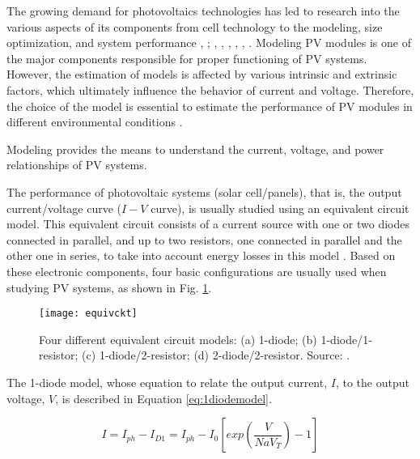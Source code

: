 The growing demand for photovoltaics technologies has led to research into the various aspects of its components from cell technology to the modeling, size optimization, and system performance \cite{Rajanna}, \cite{Badejani}; \cite{Yatimi}, \cite{Ferrari}, \cite{Saloux}, \cite{Hasan}, \cite{King}, \cite{Mellit}. Modeling PV modules is one of the major components responsible for proper functioning of PV systems. However, the estimation of models is affected by various intrinsic and extrinsic factors, which ultimately influence the behavior of current and voltage. Therefore, the choice of the model is essential to estimate the performance of PV modules in different environmental conditions \cite{Jakhrani}.
 
Modeling provides the means to understand the current, voltage, and power relationships of PV systems.
  
The performance of photovoltaic systems (solar cell/panels), that is, the output current/voltage curve ($I-V$ curve), is usually studied using an equivalent circuit model. This equivalent circuit consists of a current source with one or two diodes connected in parallel, and up to two resistors, one connected in parallel and the other one in series, to take into account energy losses in this model \cite{Cubas}. Based on these electronic components, four basic configurations are usually used when studying PV systems, as shown in Fig. \ref{fig:equivckt}. 

\begin{figure}[h]
\texttt{[image: equivckt]}
\centering
\caption{Four different equivalent circuit models: (a) 1-diode; (b) 1-diode/1-resistor; (c) 1-diode/2-resistor; (d) 2-diode/2-resistor. Source: \cite{Cubas}.}
\label{fig:equivckt}
\end{figure}
 
The 1-diode model, whose equation to relate the output current, $I$, to the output voltage, $V$, is described in Equation \ref{eq:1diodemodel}. 

\begin{equation}
\label{eq:1diodemodel}
I = I_{ph}-I_{D1}=I_{ph}-I_{0}\left[ exp \left( \dfrac{V}{NaV_{T}} \right) -1 \right] 
\end{equation}

